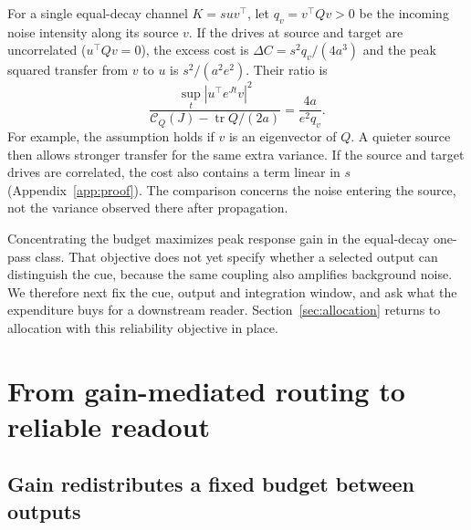 \documentclass[aps,10pt,onecolumn,superscriptaddress,nofootinbib,longbibliography,
  amsmath,amssymb,floatfix]{revtex4-2}
\newcommand{\Tr}{\operatorname{tr}}
\newcommand{\Cnoise}{\mathcal C}
\begin{document}
For a single equal-decay channel \(K=suv^\top\), let
\(q_v=v^\top Qv>0\) be the incoming noise intensity along its
source \(v\). If the drives at source and target are uncorrelated
(\(u^\top Qv=0\)), the excess cost is
\(\Delta C=s^2q_v/(4a^3)\) and the peak squared transfer from \(v\)
to \(u\) is \(s^2/(a^2e^2)\). Their ratio is
\begin{equation}
  \frac{\sup_t |u^\top e^{Jt}v|^2}
       {\Cnoise_Q(J)-\Tr Q/(2a)}
      =\frac{4a}{e^2 q_v}.
  \label{eq:anisotropic}
\end{equation}
For example, the assumption holds if \(v\) is an eigenvector of
\(Q\). A quieter source then allows stronger transfer for the same
extra variance. If the source and target drives are correlated,
the cost also contains a term linear in \(s\)
(Appendix~\ref{app:proof}). The comparison concerns the noise entering
the source, not the variance observed there after propagation.

Concentrating the budget maximizes peak response gain in the
equal-decay one-pass class. That objective does not yet specify
whether a selected output can distinguish the cue, because the
same coupling also amplifies background noise. We therefore next
fix the cue, output and integration window, and ask what the
expenditure buys for a downstream reader. Section~\ref{sec:allocation}
returns to allocation with this reliability objective in place.

\section{From gain-mediated routing to reliable readout}
\label{sec:window}

\subsection{Gain redistributes a fixed budget between outputs}
\end{document}
